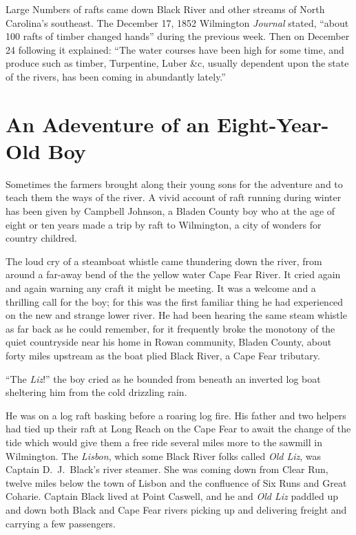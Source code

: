 \documentclass[11pt, a5paper]{book}
\begin{document}
Large Numbers of rafts came down Black River and other streams of
North Carolina's southeast.  The December 17, 1852 Wilmington
\textit{Journal} stated, ``about 100 rafts of timber changed hands''
during the previous week.  Then on December 24 following it explained:
``The water courses have been high for some time, and produce such as
timber, Turpentine, Luber \&c, usually dependent upon the state of the
rivers, has been coming in abundantly lately.''\par

\section*{An Adeventure of an Eight-Year-Old Boy}

Sometimes the farmers brought along their young sons for the adventure
and to teach them the ways of the river.  A vivid account of raft
running during winter has been given by Campbell Johnson, a Bladen
County boy who at the age of eight or ten years made a trip by raft to
Wilmington, a city of wonders for country childred.\par

The loud cry of a steamboat whistle came thundering down the river,
from around a far-away bend of the the yellow water Cape Fear River.
It cried again and again warning any craft it might be meeting.  It
was a welcome and a thrilling call for the boy; for this was the first
familiar thing he had experienced on the new and strange lower river.
He had been hearing the same steam whistle as far back as he could
remember, for it frequently broke the monotony of the quiet
countryside near his home in Rowan community, Bladen County, about
forty miles upstream as the boat plied Black River, a Cape Fear
tributary.\par

``The \textit{Liz}!'' the boy cried as he bounded from beneath an
inverted log boat sheltering him from the cold drizzling rain.\par

He was on a log raft basking before a roaring log fire.  His father
and two helpers had tied up their raft at Long Reach on the Cape Fear
to await the change of the tide which would give them a free ride
several miles more to the sawmill in Wilmington.  The \textit{Lisbon},
which some Black River folks called \textit{Old Liz}, was Captain
D.~J.\ Black's river steamer.  She was
coming down from Clear Run, twelve miles below the town of Lisbon and
the confluence of Six Runs and Great Coharie.  Captain Black lived at
Point Caswell, and he and \textit{Old Liz} paddled up and down both
Black and Cape Fear rivers picking up and delivering freight and
carrying a few passengers.\par
\end{document}
